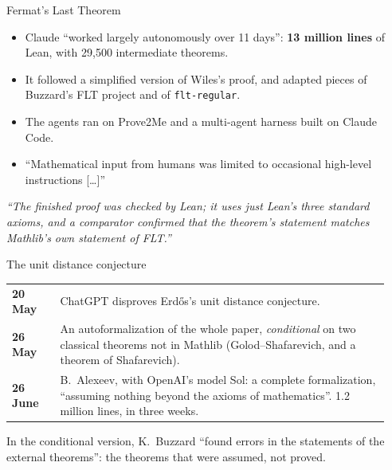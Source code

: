 \documentclass[10pt, aspectratio=169]{beamer}
\begin{document}
\begin{frame}[fragile]{Fermat's Last Theorem}
\begin{itemize}
\item Claude ``worked largely autonomously over 11 days'': \textbf{13 million lines} of Lean, with 29,500 intermediate theorems.
\item It followed a simplified version of Wiles's proof, and adapted pieces of Buzzard's FLT project and of \texttt{flt-regular}.
\item The agents ran on Prove2Me and a multi-agent harness built on Claude Code.
\item ``Mathematical input from humans was limited to occasional high-level instructions [\dots]''
\end{itemize}

\vspace{0.4em}
\begin{paper}
\itshape ``The finished proof was checked by Lean; it uses just Lean's three standard axioms, and a comparator confirmed that the theorem's statement matches Mathlib's own statement of FLT.''
\end{paper}

\end{frame}

\begin{frame}[fragile]{The unit distance conjecture}
\renewcommand{\arraystretch}{1.35}
\begin{tabular}{@{}>{\bfseries}p{0.12\linewidth}>{\raggedright\arraybackslash}p{0.82\linewidth}@{}}
\toprule
20 May & ChatGPT disproves Erdős's unit distance conjecture.\\
26 May & An autoformalization of the whole paper, \emph{conditional} on two classical theorems not in Mathlib (Golod--Shafarevich, and a theorem of Shafarevich).\\
26 June & B.\ Alexeev, with OpenAI's model Sol: a complete formalization, ``assuming nothing beyond the axioms of mathematics''. 1.2 million lines, in three weeks.\\
\bottomrule
\end{tabular}

\vspace{0.6em}
\begin{caveat}
In the conditional version, K.\ Buzzard ``found errors in the statements of the external theorems'': the theorems that were assumed, not proved.
\end{caveat}

\end{frame}
\end{document}
